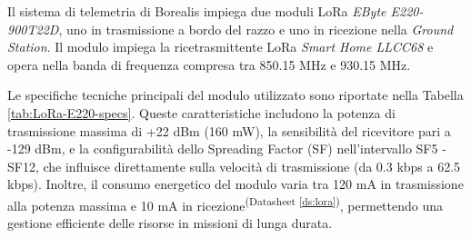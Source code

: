 \documentclass[12pt,a4paper,twoside]{book}
\newcommand{\dsref}[1]{\textsuperscript{(Datasheet \ref{#1})}}
\begin{document}
Il sistema di telemetria di Borealis impiega due moduli \ac{LoRa}
\emph{EByte E220-900T22D}, uno in trasmissione a bordo del razzo e uno in
ricezione nella \emph{Ground Station}.
Il modulo impiega la ricetrasmittente \ac{LoRa} \emph{Smart Home LLCC68} e
opera nella banda di frequenza compresa tra 850.15 MHz e 930.15 MHz.

Le specifiche tecniche principali del modulo utilizzato sono riportate nella
Tabella \ref{tab:LoRa-E220-specs}. Queste caratteristiche includono la potenza di
trasmissione massima di +22 dBm (160 mW), la sensibilità del ricevitore pari a
-129 dBm, e la configurabilità dello Spreading Factor (SF) nell'intervallo
SF5 - SF12, che influisce direttamente sulla velocità di trasmissione (da 0.3 kbps
a 62.5 kbps). Inoltre, il consumo energetico del modulo varia tra 120 mA in
trasmissione alla potenza massima e 10 mA in ricezione\dsref{ds:lora}, permettendo una gestione
efficiente delle risorse in missioni di lunga durata.

\begin{table}[H]
    \centering
    \caption{Caratteristiche tecniche del modulo \ac{LoRa} EByte E220-900T22D.}
    \label{tab:LoRa-E220-specs}
\end{table}
\end{document}
